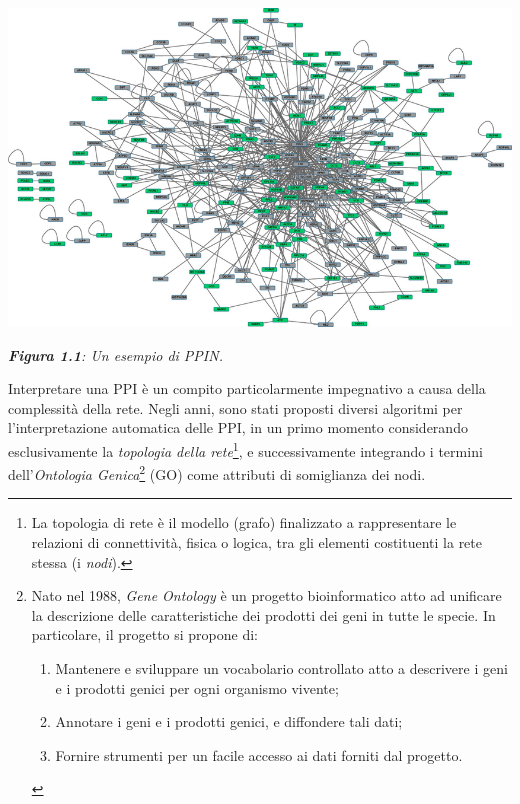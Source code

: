 \documentclass[11pt]{article}
\begin{document}
\begin{center}
\includegraphics[scale=0.46]{woo}

\begin{small}\textit{\textbf{Figura 1.1}: Un esempio di PPIN.}\end{small}
\end{center}

Interpretare una PPI è un compito particolarmente impegnativo a causa della complessità della rete. Negli anni, sono stati proposti diversi algoritmi per l'interpretazione automatica delle PPI, in un primo momento considerando esclusivamente la \textit{topologia della rete}\footnote{La topologia di rete è il modello (grafo) finalizzato a rappresentare le relazioni di connettività, fisica o logica, tra gli elementi costituenti la rete stessa (i \textit{nodi}).}, e successivamente integrando i termini dell'\textit{Ontologia Genica}\footnote{Nato nel 1988, \textit{Gene Ontology} è un progetto bioinformatico atto ad unificare la descrizione delle caratteristiche dei prodotti dei geni in tutte le specie. In particolare, il progetto si propone di: 
\begin{enumerate}
\setlength{\itemsep}{1pt}
  \setlength{\parskip}{0pt}
  \setlength{\parsep}{0pt}
\item Mantenere e sviluppare un vocabolario controllato atto a descrivere i geni e i prodotti genici per ogni organismo vivente;
\item Annotare i geni e i prodotti genici, e diffondere tali dati;
\item Fornire strumenti per un facile accesso ai dati forniti dal progetto.
\end{enumerate} 
} (GO) come attributi di somiglianza dei nodi. 
\end{document}
